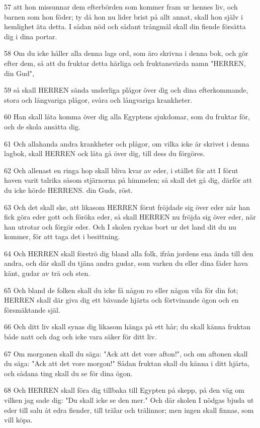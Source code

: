 \par 57 att hon missunnar dem efterbörden som kommer fram ur hennes liv, och barnen som hon föder; ty då hon nu lider brist på allt annat, skall hon själv i hemlighet äta detta. I sådan nöd och sådant trångmål skall din fiende försätta dig i dina portar.
\par 58 Om du icke håller alla denna lags ord, som äro skrivna i denna bok, och gör efter dem, så att du fruktar detta härliga och fruktansvärda namn "HERREN, din Gud",
\par 59 så skall HERREN sända underliga plågor över dig och dina efterkommande, stora och långvariga plågor, svåra och långvariga krankheter.
\par 60 Han skall låta komma över dig alla Egyptens sjukdomar, som du fruktar för, och de skola ansätta dig.
\par 61 Och allahanda andra krankheter och plågor, om vilka icke är skrivet i denna lagbok, skall HERREN ock låta gå över dig, till dess du förgöres.
\par 62 Och allenast en ringa hop skall bliva kvar av eder, i stället för att I förut haven varit talrika såsom stjärnorna på himmelen; så skall det gå dig, därför att du icke hörde HERRENS. din Guds, röst.
\par 63 Och det skall ske, att likasom HERREN förut fröjdade sig över eder när han fick göra eder gott och föröka eder, så skall HERREN nu fröjda sig över eder, när han utrotar och förgör eder. Och I skolen ryckas bort ur det land dit du nu kommer, för att taga det i besittning.
\par 64 Och HERREN skall förströ dig bland alla folk, ifrån jordens ena ända till den andra, och där skall du tjäna andra gudar, som varken du eller dina fäder hava känt, gudar av trä och sten.
\par 65 Och bland de folken skall du icke få någon ro eller någon vila för din fot; HERREN skall där giva dig ett bävande hjärta och förtvinande ögon och en försmäktande själ.
\par 66 Och ditt liv skall synas dig likasom hänga på ett hår; du skall känna fruktan både natt och dag och icke vara säker för ditt liv.
\par 67 Om morgonen skall du säga: "Ack att det vore afton!", och om aftonen skall du säga: "Ack att det vore morgon!" Sådan fruktan skall du känna i ditt hjärta, och sådana ting skall du se för dina ögon.
\par 68 Och HERREN skall föra dig tillbaka till Egypten på skepp, på den väg om vilken jag sade dig: "Du skall icke se den mer." Och där skolen I nödgas bjuda ut eder till salu åt edra fiender, till trälar och trälinnor; men ingen skall finnas, som vill köpa.

